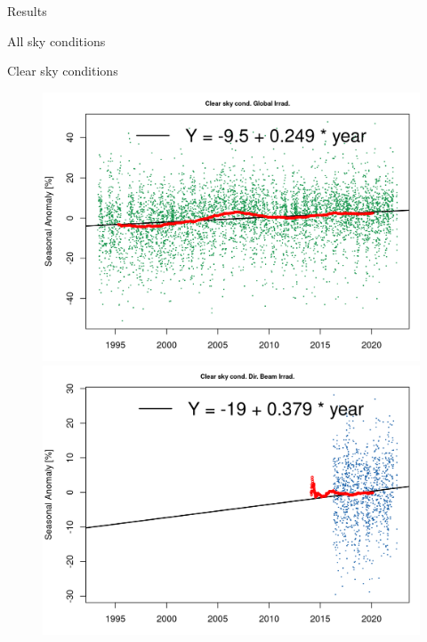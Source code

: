 \documentclass[
  ignorenonframetext,
]{beamer}
\begin{document}
\begin{frame}{Results}
\begin{block}{All sky conditions}
\begin{figure}
\begin{minipage}[t]{0.50\linewidth}
{}

\end{minipage}%

\end{figure}
\end{block}

\begin{block}{Clear sky conditions}
\protect\hypertarget{clear-sky-conditions}{}
\begin{figure}

\begin{minipage}[t]{0.50\linewidth}

{\centering 

\includegraphics[width=4.48in,height=\textheight]{images/DHI_GHI_1_longterm_trends_files/figure-html/longtermtrendsCS-4.png}

}

\end{minipage}%
%
\begin{minipage}[t]{0.50\linewidth}

{\centering 

\includegraphics[width=4.48in,height=\textheight]{images/DHI_GHI_1_longterm_trends_files/figure-html/longtermtrendsCS-3.png}

}
\end{minipage}
\end{figure}
\end{block}
\end{frame}
\end{document}
